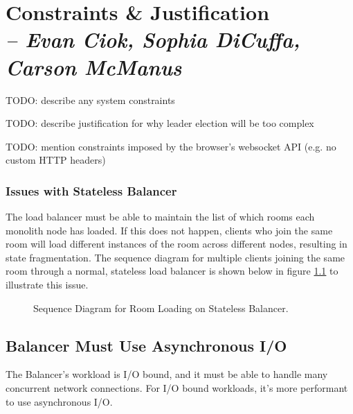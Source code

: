 \chapter{Constraints \& Justification \\
  \small{\textit{-- Evan Ciok, Sophia DiCuffa, Carson McManus}}
  \label{Chapter::ConstraintsJustification}}


TODO: describe any system constraints

TODO: describe justification for why leader election will be too complex

TODO: mention constraints imposed by the browser's websocket API (e.g. no custom HTTP headers)

\subsection{Issues with Stateless Balancer}

The load balancer must be able to maintain the list of which rooms each monolith node has loaded. If this does not happen, clients who join the same room will load different instances of the room across different nodes, resulting in state fragmentation. The sequence diagram for multiple clients joining the same room through a normal, stateless load balancer is shown below in figure \ref{Figure::join-room-stateless} to illustrate this issue.

\begin{figure}[!htb]
  \centering
  \caption{\label{Figure::join-room-stateless} Sequence Diagram for Room Loading on Stateless Balancer.}
\end{figure}


\section{Balancer Must Use Asynchronous I/O}

The Balancer's workload is I/O bound, and it must be able to handle many concurrent network connections. For I/O bound workloads, it's more performant to use asynchronous I/O\cite{async-vs-threads}.
